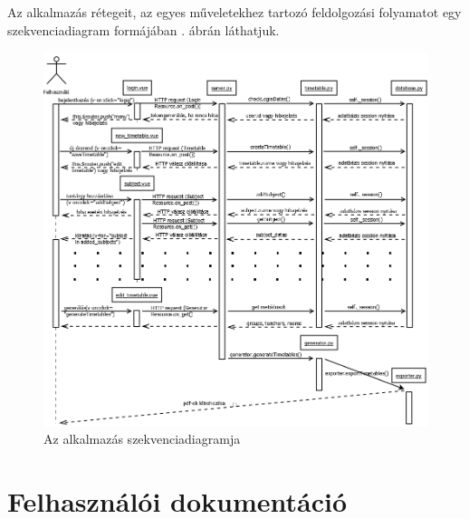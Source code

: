Az alkalmazás rétegeit, az egyes műveletekhez tartozó feldolgozási folyamatot egy szekvenciadiagram formájában . ábrán láthatjuk.

\begin{figure}[h!]
\includegraphics[width=\linewidth]{images/szekvencia.png}
\caption{Az alkalmazás szekvenciadiagramja}
\label{fig:sequence}
\end{figure}

\section{Felhasználói dokumentáció}

